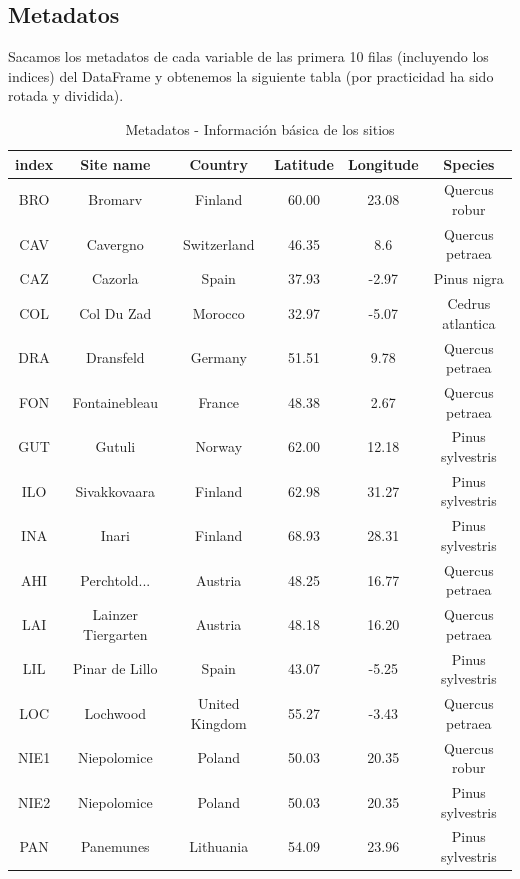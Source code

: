 \documentclass[a4paper,11pt]{article}
\begin{document}
\subsection*{Metadatos}

Sacamos los metadatos de cada variable de las primera 10 filas (incluyendo los indices) del DataFrame y
obtenemos la siguiente tabla (por practicidad ha sido rotada y dividida).

\begin{table}[ht]
	\centering
	\caption{Metadatos - Información básica de los sitios}
	\label{tab:metadatos1}
	\begin{tabular}{|c|c|c|c|c|c|}
		\hline
		index & Site name & Country & Latitude & Longitude & Species \\
		\hline
		BRO & Bromarv & Finland & 60.00 & 23.08 & Quercus robur \\
		CAV & Cavergno & Switzerland & 46.35 & 8.6 & Quercus petraea \\
		CAZ & Cazorla & Spain & 37.93 & -2.97 & Pinus nigra \\
		COL & Col Du Zad & Morocco & 32.97 & -5.07 & Cedrus atlantica \\
		DRA & Dransfeld & Germany & 51.51 & 9.78 & Quercus petraea \\
		FON & Fontainebleau & France & 48.38 & 2.67 & Quercus petraea \\
		GUT & Gutuli & Norway & 62.00 & 12.18 & Pinus sylvestris \\
		ILO & Sivakkovaara & Finland & 62.98 & 31.27 & Pinus sylvestris \\
		INA & Inari & Finland & 68.93 & 28.31 & Pinus sylvestris \\
		AHI & Perchtold... & Austria & 48.25 & 16.77 & Quercus petraea \\
		LAI & Lainzer Tiergarten & Austria & 48.18 & 16.20 & Quercus petraea \\
		LIL & Pinar de Lillo & Spain & 43.07 & -5.25 & Pinus sylvestris \\
		LOC & Lochwood & United Kingdom & 55.27 & -3.43 & Quercus petraea \\
		NIE1 & Niepolomice & Poland & 50.03 & 20.35 & Quercus robur \\
		NIE2 & Niepolomice & Poland & 50.03 & 20.35 & Pinus sylvestris \\
		PAN & Panemunes & Lithuania & 54.09 & 23.96 & Pinus sylvestris \\

\end{tabular}
\end{table}
\end{document}
